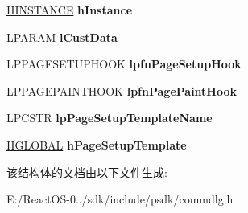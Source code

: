 \begin{DoxyCompactItemize}
\hyperlink{interfacevoid}{H\+I\+N\+S\+T\+A\+N\+CE} {\bfseries h\+Instance}
\item 
\mbox{\label{structtag_p_s_d_a_ae1aebf95d4ac5a9562aaf4ca87f69a43}} 
L\+P\+A\+R\+AM {\bfseries l\+Cust\+Data}
\item 
\mbox{\label{structtag_p_s_d_a_abf8f48b34850cc45d1fa4c9ff0f6d3f1}} 
L\+P\+P\+A\+G\+E\+S\+E\+T\+U\+P\+H\+O\+OK {\bfseries lpfn\+Page\+Setup\+Hook}
\item 
\mbox{\label{structtag_p_s_d_a_ab4dcfbe78dcfb273a699d43c92ba9177}} 
L\+P\+P\+A\+G\+E\+P\+A\+I\+N\+T\+H\+O\+OK {\bfseries lpfn\+Page\+Paint\+Hook}
\item 
\mbox{\label{structtag_p_s_d_a_a591a69df36ffe18da0b2bbe74d1c6351}} 
L\+P\+C\+S\+TR {\bfseries lp\+Page\+Setup\+Template\+Name}
\item 
\mbox{\label{structtag_p_s_d_a_a913afb8cea25512062db4bd3b69361c9}} 
\hyperlink{interfacevoid}{H\+G\+L\+O\+B\+AL} {\bfseries h\+Page\+Setup\+Template}
\end{DoxyCompactItemize}


该结构体的文档由以下文件生成\+:\begin{DoxyCompactItemize}
\item 
E\+:/\+React\+O\+S-\/0../sdk/include/psdk/commdlg.\+h\end{DoxyCompactItemize}
